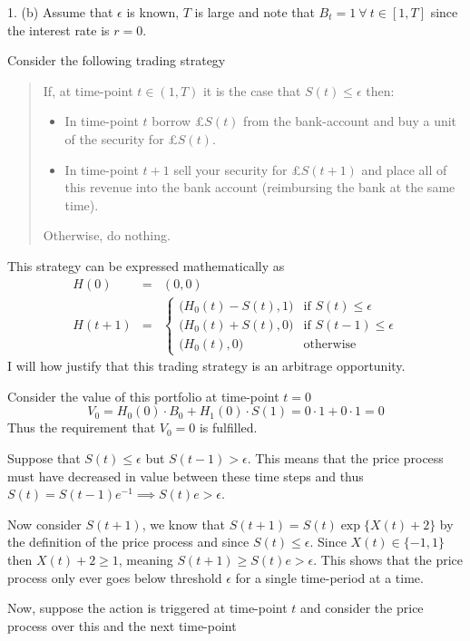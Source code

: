 \documentclass[11pt,a4paper]{article}
\begin{document}
\begin{answer}{1. (b)}
  Assume that $\epsilon$ is known, $T$ is large and note that $B_t=1\ \forall\ t\in[1,T]$ since the interest rate is $r=0$.
  \par Consider the following trading strategy
  \begin{quote}
    If, at time-point $t\in(1,T)$ it is the case that $S(t)\leq\epsilon$ then:
    \begin{itemize}
      \item In time-point $t$ borrow £$S(t)$ from the bank-account and buy a unit of the security for £$S(t)$.
      \item In time-point $t+1$ sell your security for £$S(t+1)$ and place all of this revenue into the bank account (reimbursing the bank at the same time).
    \end{itemize}
    Otherwise, do nothing.
  \end{quote}
  This strategy can be expressed mathematically as
  \[\begin{array}{rcl}
    H(0)&=&(0,0)\\
    H(t+1)&=&\begin{cases}
      \big(H_0(t)-S(t),1\big)&\text{if }S(t)\leq\epsilon\\
      \big(H_0(t)+S(t),0\big)&\text{if }S(t-1)\leq\epsilon\\
      \big(H_0(t),0\big)&\text{otherwise}
  \end{cases}
  \end{array}\]
  I will how justify that this trading strategy is an arbitrage opportunity.

  \par Consider the value of this portfolio at time-point $t=0$
  \[ V_0=H_0(0)\cdot B_0+H_1(0)\cdot S(1)=0\cdot1+0\cdot1=0 \]
  Thus the requirement that $V_0=0$ is fulfilled.

  \par Suppose that $S(t)\leq\epsilon$ but $S(t-1)>\epsilon$. This means that the price process must have decreased in value between these time steps and thus $S(t)=S(t-1)e^{-1}\implies S(t)e>\epsilon$.
  \par Now consider $S(t+1)$, we know that $S(t+1)=S(t)\exp\{X(t)+2\}$ by the definition of the price process and since $S(t)\leq\epsilon$. Since $X(t)\in\{-1,1\}$ then $X(t)+2\geq1$, meaning $S(t+1)\geq S(t)e>\epsilon$. This shows that the price process only ever goes below threshold $\epsilon$ for a single time-period at a time.

  \par Now, suppose the action is triggered at time-point $t$ and consider the price process over this and the next time-point


\end{answer}
\end{document}
